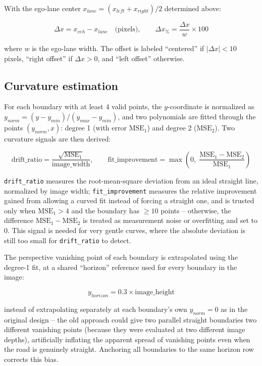 \documentclass[12pt,a4paper]{report}
\begin{document}
With the ego-lane center $x_{lane} = (x_{left} + x_{right})/2$ determined above:

\[
\Delta x = x_{veh} - x_{lane} \quad \text{(pixels)}, \qquad \Delta x_{\%} = \frac{\Delta x}{w} \times 100
\]

where $w$ is the ego-lane width. The offset is labeled ``centered'' if $|\Delta x| < 10$ pixels, ``right offset'' if $\Delta x > 0$, and ``left offset'' otherwise.

\subsection{Curvature estimation}

For each boundary with at least 4 valid points, the $y$-coordinate is normalized as $y_{norm} = (y - y_{min})/(y_{max} - y_{min})$, and two polynomials are fitted through the points $(y_{norm}, x)$: degree 1 (with error $\text{MSE}_1$) and degree 2 ($\text{MSE}_2$). Two curvature signals are then derived:

\[
\text{drift\_ratio} = \frac{\sqrt{\text{MSE}_1}}{\text{image\_width}}, \qquad
\text{fit\_improvement} = \max\!\left(0,\; \frac{\text{MSE}_1 - \text{MSE}_2}{\text{MSE}_1}\right)
\]

\texttt{drift\_ratio} measures the root-mean-square deviation from an ideal straight line, normalized by image width; \texttt{fit\_improvement} measures the relative improvement gained from allowing a curved fit instead of forcing a straight one, and is trusted only when $\text{MSE}_1 > 4$ and the boundary has $\ge 10$ points -- otherwise, the difference $\text{MSE}_1-\text{MSE}_2$ is treated as measurement noise or overfitting and set to 0. This signal is needed for very gentle curves, where the absolute deviation is still too small for \texttt{drift\_ratio} to detect.

The perspective vanishing point of each boundary is extrapolated using the degree-1 fit, at a shared ``horizon'' reference used for every boundary in the image:

\[
y_{horizon} = 0.3 \times \text{image\_height}
\]

instead of extrapolating separately at each boundary's own $y_{norm}=0$ as in the original design -- the old approach could give two parallel straight boundaries two different vanishing points (because they were evaluated at two different image depths), artificially inflating the apparent spread of vanishing points even when the road is genuinely straight. Anchoring all boundaries to the same horizon row corrects this bias.
\end{document}
